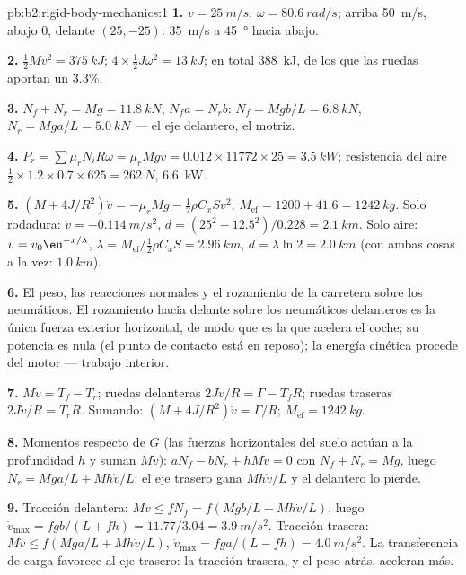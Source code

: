 \begin{solution}{pb:b2:rigid-body-mechanics:1}
\textbf{1.} $v = \qty{25}{m/s}$, $\omega = \qty{80.6}{rad/s}$; arriba \qty{50}{m/s},
abajo $0$, delante $(25, -25)$: \qty{35}{m/s} a \qty{45}{\degree} hacia abajo.

\textbf{2.} $\tfrac12Mv^2 = \qty{375}{kJ}$; $4 \times \tfrac12J\omega^2 = \qty{13}{kJ}$;
en total \qty{388}{kJ}, de los que las ruedas aportan un $3.3\%$.

\textbf{3.} $N_f + N_r = Mg = \qty{11.8}{kN}$, $N_fa = N_rb$: $N_f = Mgb/L =
\qty{6.8}{kN}$, $N_r = Mga/L = \qty{5.0}{kN}$ --- el eje delantero, el motriz.

\textbf{4.} $P_r = \sum\mu_rN_iR\omega = \mu_rMgv = 0.012 \times 11772 \times 25 =
\qty{3.5}{kW}$; resistencia del aire $\tfrac12 \times 1.2 \times 0.7 \times 625 = \qty{262}{N}$, \qty{6.6}{kW}.

\textbf{5.} $(M + 4J/R^2)\dot v = -\mu_rMg - \tfrac12\rho C_xSv^2$, $M_{\text{ef}} =
1200 + 41.6 = \qty{1242}{kg}$. Solo rodadura: $\dot v = \qty{-0.114}{m/s^2}$,
$d = (25^2 - 12.5^2)/0.228 = \qty{2.1}{km}$. Solo aire: $v = v_0\eu^{-x/\lambda}$,
$\lambda = M_{\text{ef}}/\tfrac12\rho C_xS = \qty{2.96}{km}$, $d = \lambda\ln2 =
\qty{2.0}{km}$ (con ambas cosas a la vez: $\qty{1.0}{km}$).

\textbf{6.} El peso, las reacciones normales y el rozamiento de la carretera
sobre los neumáticos. El rozamiento hacia delante sobre los neumáticos
delanteros es la única fuerza exterior horizontal, de modo que es la que
acelera el coche; su potencia es nula (el punto de contacto está en
reposo); la energía cinética procede del motor --- trabajo interior.

\textbf{7.} $M\dot v = T_f - T_r$; ruedas delanteras $2J\dot v/R = \Gamma - T_fR$;
ruedas traseras $2J\dot v/R = T_rR$. Sumando: $(M + 4J/R^2)\dot v = \Gamma/R$;
$M_{\text{ef}} = \qty{1242}{kg}$.

\textbf{8.} Momentos respecto de $G$ (las fuerzas horizontales del suelo
actúan a la profundidad $h$ y suman $M\dot v$): $aN_f - bN_r + hM\dot v = 0$ con $N_f + N_r = Mg$, luego
$N_r = Mga/L + Mh\dot v/L$: el eje trasero gana $Mh\dot v/L$ y el delantero lo pierde.

\textbf{9.} Tracción delantera: $M\dot v \le fN_f = f(Mgb/L - Mh\dot v/L)$, luego
$\dot v_{\max} = fgb/(L + fh) = 11.77/3.04 = \qty{3.9}{m/s^2}$. Tracción trasera:
$M\dot v \le f(Mga/L + Mh\dot v/L)$, $\dot v_{\max} = fga/(L - fh) = \qty{4.0}{m/s^2}$.
La transferencia de carga favorece al eje trasero: la tracción trasera, y
el peso atrás, aceleran más.


\end{solution}
